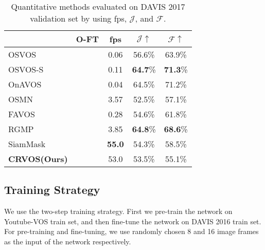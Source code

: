 \documentclass{article}
\begin{document}
\begin{table}[t]
	\centering
	\begin{tabular}{l | c c c c}
		                                     & O-FT       & fps           & $\mathcal{J}\uparrow$ & $\mathcal{F}\uparrow$ \\ \midrule
		OSVOS \cite{caelles2017one}          & \checkmark & 0.06          & 56.6\%                & 63.9\%                \\
		OSVOS-S \cite{maninis2018video}      & \checkmark & 0.11          & \textbf{64.7}\%       & \textbf{71.3}\%       \\
		OnAVOS \cite{voigtlaender2017online} & \checkmark & 0.04          & 64.5\%                & 71.2\%                \\ \midrule
		OSMN \cite{yang2018efficient}        &            & 3.57          & 52.5\%                & 57.1\%                \\
		FAVOS \cite{cheng2018fast}           &            & 0.28          & 54.6\%                & 61.8\%                \\
		RGMP \cite{wug2018fast}              &            & 3.85          & \textbf{64.8}\%       & \textbf{68.6}\%       \\
		SiamMask \cite{wang2019fast}         &            & \textbf{55.0} & 54.3\%                & 58.5\%                \\
		\textbf{CRVOS(Ours)}                 &            & 53.0          & 53.5\%                & 55.1\%
	\end{tabular}
	\caption{Quantitative methods evaluated on DAVIS 2017 validation set by using fps, $\mathcal{J}$, and $\mathcal{F}$.}
	\label{results table 17}
\end{table}



\subsection{Training Strategy} \label{training}
We use the two-step training strategy. First we pre-train the network on Youtube-VOS \cite{xu2018youtube_1} train set, and then fine-tune the network on DAVIS 2016 \cite{perazzi2016benchmark} train set. For pre-training and fine-tuning, we use randomly chosen 8 and 16 image frames as the input of the network respectively.
\end{document}
